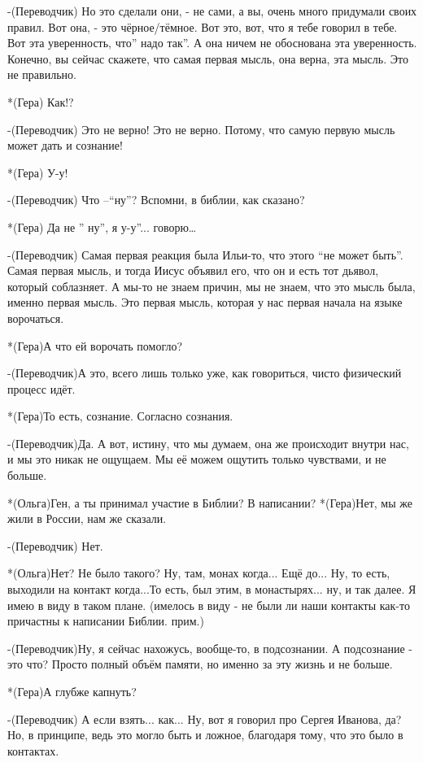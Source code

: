 -(Переводчик) Но это сделали они, - не сами, а вы, очень много придумали своих правил. Вот она, - это чёрное/тёмное. Вот это, вот, что я тебе говорил в тебе. Вот эта уверенность, что” надо так”. А она ничем не обоснована эта уверенность. Конечно, вы сейчас скажете, что самая первая мысль, она верна, эта мысль. Это не правильно.

*(Гера) Как!?

-(Переводчик) Это не верно! Это не верно. Потому, что самую первую мысль может дать и сознание!

*(Гера) У-у! 

-(Переводчик) Что –“ну”? Вспомни, в библии, как сказано? 

*(Гера) Да не ” ну”,  я  у-у”... говорю…

-(Переводчик) Самая первая реакция была Ильи-то, что этого “не может быть”. Самая первая мысль, и тогда Иисус объявил его, что он и есть тот дьявол, который соблазняет. А мы-то не знаем причин, мы не знаем, что это мысль была, именно первая мысль.  Это первая мысль, которая у нас первая начала на языке ворочаться. 

*(Гера)А что ей ворочать помогло?

-(Переводчик)А это, всего лишь только уже, как говориться, чисто физический процесс идёт.

*(Гера)То есть, сознание. Согласно сознания.

-(Переводчик)Да. А вот, истину, что мы думаем, она же происходит внутри нас, и мы это никак не ощущаем. Мы её можем ощутить только чувствами, и не больше.

*(Ольга)Ген, а ты принимал участие в Библии? В написании?
*(Гера)Нет, мы же жили в России, нам же сказали.

-(Переводчик) Нет.

*(Ольга)Нет? Не было такого? Ну, там, монах когда... Ещё до... Ну, то есть, выходили на контакт когда...То есть, был этим, в монастырях... ну, и так далее. Я имею в виду в таком плане. (имелось в виду - не были ли наши контакты как-то причастны к написании Библии. прим.)

-(Переводчик)Ну, я сейчас нахожусь, вообще-то, в подсознании. А подсознание - это что? Просто полный объём памяти, но именно за эту жизнь и не больше.

*(Гера)А глубже капнуть?

-(Переводчик) А если взять... как... Ну, вот я говорил про Сергея Иванова, да? Но, в принципе, ведь это могло быть и ложное, благодаря тому, что это было в контактах.

